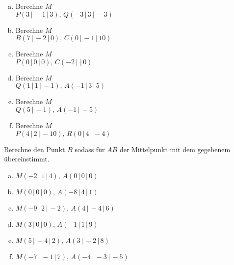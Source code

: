 \documentclass[a4paper,12pt]{article}
\newcommand{\Aufgabe}[2]{
	{
		\vspace*{0.3cm}
		\begin{tcolorbox}[breakable,colback=yellow!0,colframe=black!65!white,title=\textbf{Aufgabe #1:},width=\linewidth ]
			{#2}
		\end{tcolorbox}
		
		
	}
}
\begin{document}
	\Aufgabe{(Finde den Mittelpunkt der Strecken)}{
	\begin{multicols}{2}
		\begin{enumerate}[(a)]
			\item Berechne $M$\\
			$P(3\,|\,-1 \,|\,3),\, Q(-3\,|\,3 \,|\,-3)$
			\item Berechne $M$\\
			$B(7\,|\,-2 \,|\,0),\, C(0\,|\,-1 \,|\,10)$
			\item Berechne $M$\\
			$P(0\,|\,0 \,|\,0),\, C(-2\,|\, \,|\,0)$
			\item Berechne $M$\\
			$Q(1\,|\,1 \,|\,-1),\, A(-1\,|\,3 \,|\,5)$
			\item Berechne $M$\\
			$Q(5\,|\,-1),\, A(-1\,|\,-5)$
			\item Berechne $M$\\
			$P(4\,|\,2 \,|\,-10),\, R(0\,|\,4 \,|\,-4)$
		\end{enumerate}
\end{multicols}}
	\Aufgabe{(Rückrechnung Mittelpunkt der Strecken)}{
		Berechne den Punkt $B$ sodass für $\overline{AB}$ der Mittelpunkt mit dem gegebenem übereinstimmt.
		\begin{multicols}{2}
			\begin{enumerate}[(a)]
				\item $M(-2\,|\,1 \,|\,4),\, A(0\,|\,0 \,|\,0)$
				\item $M(0\,|\,0 \,|\,0),\, A(-8\,|\,4 \,|\,1)$
				\item $M(-9\,|\,2 \,|\,-2),\, A(4\,|\,-4 \,|\,6)$
				\item $M(3\,|\,0 \,|\,0),\, A(-1\,|\,1 \,|\,9)$
				\item $M(5\,|\,-4 \,|\,2),\, A(3\,|\,-2 \,|\,8)$
				\item $M(-7\,|\,-1 \,|\,7),\, A(-4\,|\,-3 \,|\,-5)$
			\end{enumerate}
	\end{multicols}}
\end{document}
